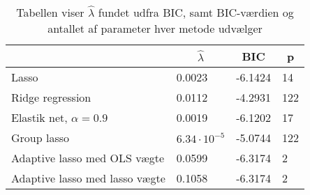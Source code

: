 \begin{table}
\center
\begin{tabular}{llll} 
\toprule
& \multicolumn{1}{c}{${\widehat\lambda}$} & \multicolumn{1}{c}{BIC} & \multicolumn{1}{c}{p} \\ \midrule
Lasso & 0.0023 & -6.1424 & 14  \\
Ridge regression & 0.0112 & -4.2931 & 122 \\
Elastik net, $\alpha = 0.9$ & 0.0019 & -6.1202 &17 \\
Group lasso & $6.34 \cdot 10^{-5}$ & -5.0744 & 122 \\
Adaptive lasso med OLS vægte & 0.0599 & -6.3174 & 2 \\
Adaptive lasso med lasso vægte &  0.1058& -6.3174 & 2\\ \bottomrule
 \end{tabular}
\caption{Tabellen viser ${\widehat\lambda}$ fundet udfra BIC, samt BIC-værdien og antallet af parameter hver metode udvælger} \label{tab:bic_lambda}
\end{table}